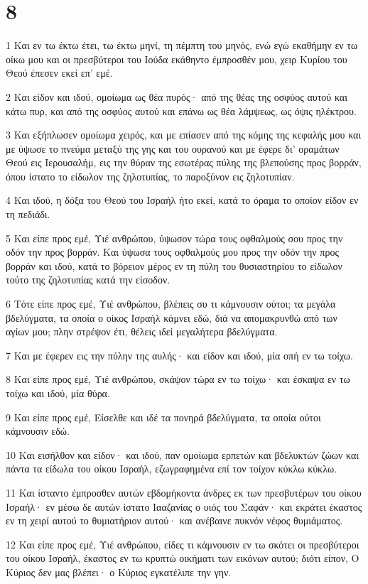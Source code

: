 \chapter{8}

\par 1 Και εν τω έκτω έτει, τω έκτω μηνί, τη πέμπτη του μηνός, ενώ εγώ εκαθήμην εν τω οίκω μου και οι πρεσβύτεροι του Ιούδα εκάθηντο έμπροσθέν μου, χειρ Κυρίου του Θεού έπεσεν εκεί επ' εμέ.
\par 2 Και είδον και ιδού, ομοίωμα ως θέα πυρός· από της θέας της οσφύος αυτού και κάτω πυρ, και από της οσφύος αυτού και επάνω ως θέα λάμψεως, ως όψις ηλέκτρου.
\par 3 Και εξήπλωσεν ομοίωμα χειρός, και με επίασεν από της κόμης της κεφαλής μου και με ύψωσε το πνεύμα μεταξύ της γης και του ουρανού και με έφερε δι' οραμάτων Θεού εις Ιερουσαλήμ, εις την θύραν της εσωτέρας πύλης της βλεπούσης προς βορράν, όπου ίστατο το είδωλον της ζηλοτυπίας, το παροξύνον εις ζηλοτυπίαν.
\par 4 Και ιδού, η δόξα του Θεού του Ισραήλ ήτο εκεί, κατά το όραμα το οποίον είδον εν τη πεδιάδι.
\par 5 Και είπε προς εμέ, Υιέ ανθρώπου, ύψωσον τώρα τους οφθαλμούς σου προς την οδόν την προς βορράν. Και ύψωσα τους οφθαλμούς μου προς την οδόν την προς βορράν και ιδού, κατά το βόρειον μέρος εν τη πύλη του θυσιαστηρίου το είδωλον τούτο της ζηλοτυπίας κατά την είσοδον.
\par 6 Τότε είπε προς εμέ, Υιέ ανθρώπου, βλέπεις συ τι κάμνουσιν ούτοι; τα μεγάλα βδελύγματα, τα οποία ο οίκος Ισραήλ κάμνει εδώ, διά να απομακρυνθώ από των αγίων μου; πλην στρέψον έτι, θέλεις ιδεί μεγαλήτερα βδελύγματα.
\par 7 Και με έφερεν εις την πύλην της αυλής· και είδον και ιδού, μία οπή εν τω τοίχω.
\par 8 Και είπε προς εμέ, Υιέ ανθρώπου, σκάψον τώρα εν τω τοίχω· και έσκαψα εν τω τοίχω και ιδού, μία θύρα.
\par 9 Και είπε προς εμέ, Είσελθε και ιδέ τα πονηρά βδελύγματα, τα οποία ούτοι κάμνουσιν εδώ.
\par 10 Και εισήλθον και είδον· και ιδού, παν ομοίωμα ερπετών και βδελυκτών ζώων και πάντα τα είδωλα του οίκου Ισραήλ, εζωγραφημένα επί τον τοίχον κύκλω κύκλω.
\par 11 Και ίσταντο έμπροσθεν αυτών εβδομήκοντα άνδρες εκ των πρεσβυτέρων του οίκου Ισραήλ· εν μέσω δε αυτών ίστατο Ιααζανίας ο υιός του Σαφάν· και εκράτει έκαστος εν τη χειρί αυτού το θυμιατήριον αυτού· και ανέβαινε πυκνόν νέφος θυμιάματος.
\par 12 Και είπε προς εμέ, Υιέ ανθρώπου, είδες τι κάμνουσιν εν τω σκότει οι πρεσβύτεροι του οίκου Ισραήλ, έκαστος εν τω κρυπτώ οικήματι των εικόνων αυτού; διότι είπον, Ο Κύριος δεν μας βλέπει· ο Κύριος εγκατέλιπε την γην.
